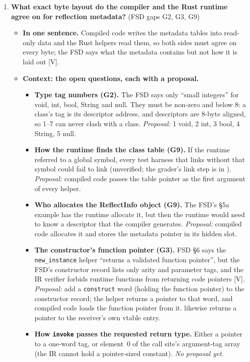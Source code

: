 \documentclass[10pt]{article}
\newcommand{\code}[1]{\texttt{\small #1}}
\newcommand{\mV}{\textsf{\scriptsize[V]}}
\newcommand{\field}[1]{\textbf{#1}\enspace}
\newcommand{\decitem}[1]{\needspace{6\baselineskip}\setcounter{enumi}{\numexpr#1-1\relax}\item}
\begin{document}
\begin{enumerate}[label=\textbf{\arabic*.},ref=\arabic*,leftmargin=1.8em,itemsep=0.8em]
\decitem{8}\label{dec:metaabi}\textbf{What exact byte layout do the compiler and the Rust runtime agree on for reflection metadata?} (FSD gaps G2, G3, G9)
\begin{itemize}
\item[] \field{In one sentence.} Compiled code writes the metadata tables into read-only data and the Rust helpers read them, so both sides must agree on every byte; the FSD says what the metadata contains but not how it is laid out \mV.
\item[] \field{Context: the open questions, each with a proposal.}
\begin{itemize}
\item \textbf{Type tag numbers (G2).} The FSD says only ``small integers'' for void, int, bool, String and null. They must be non-zero and below 8: a class's tag is its descriptor address, and descriptors are 8-byte aligned, so 1--7 can never clash with a class. \emph{Proposal:} 1 void, 2 int, 3 bool, 4 String, 5 null.
\item \textbf{How the runtime finds the class table (G9).} If the runtime referred to a global symbol, every test harness that links  without that symbol could fail to link (unverified; the grader's link step is in ). \emph{Proposal:} compiled code passes the table pointer as the first argument of every helper.
\item \textbf{Who allocates the ReflectInfo object (G9).} The FSD's §5a example has the runtime allocate it, but then the runtime would need to know a descriptor that the compiler generates. \emph{Proposal:} compiled code allocates it and stores the metadata pointer in its hidden slot.
\item \textbf{The constructor's function pointer (G3).} FSD §6 says the \code{new\_instance} helper ``returns a validated function pointer'', but the FSD's constructor record lists only arity and parameter tags, and the IR verifier forbids runtime functions from returning code pointers \mV. \emph{Proposal:} add a \code{construct} word (holding the function pointer) to the constructor record; the helper returns a pointer to that word, and compiled code loads the function pointer from it.  likewise returns a pointer to the receiver's own vtable entry.
\item \textbf{How \code{invoke} passes the requested return type.} Either a pointer to a one-word tag, or element~0 of the call site's argument-tag array (the IR cannot hold a pointer-sized constant). \emph{No proposal yet.}

\end{itemize}
\end{itemize}
\end{enumerate}
\end{document}
